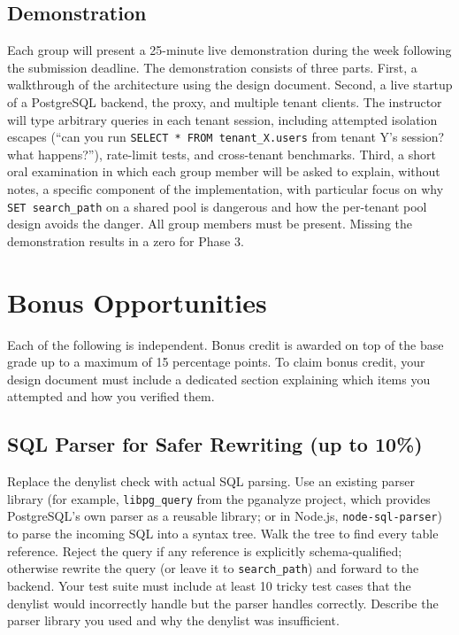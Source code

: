 \documentclass[11pt,a4paper]{article}
\begin{document}
\subsection{Demonstration}
Each group will present a 25-minute live demonstration during the week following the submission deadline. The demonstration consists of three parts. First, a walkthrough of the architecture using the design document. Second, a live startup of a PostgreSQL backend, the proxy, and multiple tenant clients. The instructor will type arbitrary queries in each tenant session, including attempted isolation escapes (``can you run \texttt{SELECT * FROM tenant\_X.users} from tenant Y's session? what happens?''), rate-limit tests, and cross-tenant benchmarks. Third, a short oral examination in which each group member will be asked to explain, without notes, a specific component of the implementation, with particular focus on why \texttt{SET search\_path} on a shared pool is dangerous and how the per-tenant pool design avoids the danger. All group members must be present. Missing the demonstration results in a zero for Phase 3.

\section{Bonus Opportunities}

Each of the following is independent. Bonus credit is awarded on top of the base grade up to a maximum of 15 percentage points. To claim bonus credit, your design document must include a dedicated section explaining which items you attempted and how you verified them.

\subsection{SQL Parser for Safer Rewriting (up to 10\%)}
Replace the denylist check with actual SQL parsing. Use an existing parser library (for example, \texttt{libpg\_query} from the pganalyze project, which provides PostgreSQL's own parser as a reusable library; or in Node.js, \texttt{node-sql-parser}) to parse the incoming SQL into a syntax tree. Walk the tree to find every table reference. Reject the query if any reference is explicitly schema-qualified; otherwise rewrite the query (or leave it to \texttt{search\_path}) and forward to the backend. Your test suite must include at least 10 tricky test cases that the denylist would incorrectly handle but the parser handles correctly. Describe the parser library you used and why the denylist was insufficient.
\end{document}
